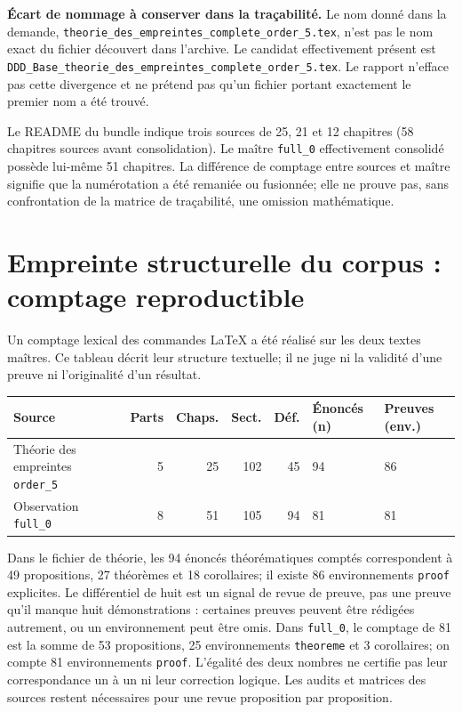 \documentclass[11pt,a4paper,oneside]{report}
\begin{document}
\textbf{Écart de nommage à conserver dans la traçabilité.} Le nom donné dans la demande, \texttt{theorie\_des\_empreintes\_complete\_order\_5.tex}, n'est pas le nom exact du fichier découvert dans l'archive. Le candidat effectivement présent est \texttt{DDD\_Base\_theorie\_des\_empreintes\_complete\_order\_5.tex}. Le rapport n'efface pas cette divergence et ne prétend pas qu'un fichier portant exactement le premier nom a été trouvé.

Le README du bundle indique trois sources de 25, 21 et 12 chapitres (58 chapitres sources avant consolidation). Le maître \texttt{full\_0} effectivement consolidé possède lui-même 51 chapitres. La différence de comptage entre sources et maître signifie que la numérotation a été remaniée ou fusionnée; elle ne prouve pas, sans confrontation de la matrice de traçabilité, une omission mathématique.

\section{Empreinte structurelle du corpus : comptage reproductible}
Un comptage lexical des commandes LaTeX a été réalisé sur les deux textes maîtres. Ce tableau décrit leur structure textuelle; il ne juge ni la validité d'une preuve ni l'originalité d'un résultat.
\begin{center}
\small
\begin{tabular}{p{3.1cm}rrrrp{1.9cm}p{1.9cm}}
\toprule
Source & Parts & Chaps. & Sect. & Déf. & Énoncés (n) & Preuves (env.)\\
\midrule
Théorie des empreintes \texttt{order\_5} & 5 & 25 & 102 & 45 & 94 & 86\\
Observation \texttt{full\_0} & 8 & 51 & 105 & 94 & 81 & 81\\
\bottomrule
\end{tabular}
\end{center}
Dans le fichier de théorie, les 94 énoncés théorématiques comptés correspondent à 49 propositions, 27 théorèmes et 18 corollaires; il existe 86 environnements \texttt{proof} explicites. Le différentiel de huit est un signal de revue de preuve, pas une preuve qu'il manque huit démonstrations : certaines preuves peuvent être rédigées autrement, ou un environnement peut être omis. Dans \texttt{full\_0}, le comptage de 81 est la somme de 53 propositions, 25 environnements \texttt{theoreme} et 3 corollaires; on compte 81 environnements \texttt{proof}. L'égalité des deux nombres ne certifie pas leur correspondance un à un ni leur correction logique. Les audits et matrices des sources restent nécessaires pour une revue proposition par proposition.
\end{document}
